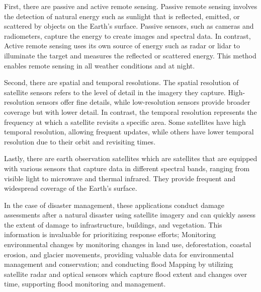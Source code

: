 \documentclass[conference]{IEEEtran}
\begin{document}
First, there are passive and active remote sensing. Passive remote sensing involves the detection of 
natural energy such as sunlight that is reflected, emitted, or scattered by objects on the Earth's 
surface. Passive sensors, such as cameras and radiometers, capture the energy to create images and 
spectral data. In contrast, Active remote sensing uses its own source of energy such as radar or lidar 
to illuminate the target and measures the reflected or scattered energy. This method enables remote 
sensing in all weather conditions and at night.\par

Second, there are spatial and temporal resolutions. The spatial resolution of satellite sensors refers 
to the level of detail in the imagery they capture. High-resolution sensors offer fine details, while 
low-resolution sensors provide broader coverage but with lower detail. In contrast, the temporal resolution 
represents the frequency at which a satellite revisits a specific area. Some satellites have high temporal 
resolution, allowing frequent updates, while others have lower temporal resolution due to their orbit and 
revisiting times.\par

Lastly, there are earth observation satellites which are satellites that are equipped with various sensors 
that capture data in different spectral bands, ranging from visible light to microwave and thermal infrared. 
They provide frequent and widespread coverage of the Earth's surface.\par

In the case of disaster management, these applications conduct damage assessments after a natural disaster 
using satellite imagery and can quickly assess the extent of damage to infrastructure, buildings, and 
vegetation. This information is invaluable for prioritizing response efforts; Monitoring environmental 
changes by monitoring changes in land use, deforestation, coastal erosion, and glacier movements, 
providing valuable data for environmental management and conservation; and conducting flood Mapping 
by utilizing satellite radar and optical sensors which capture flood extent and changes over time, 
supporting flood monitoring and management.\par
\end{document}
